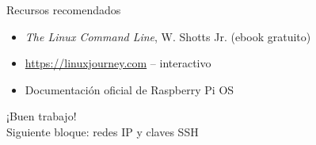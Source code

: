 \documentclass[aspectratio=169,professionalfonts]{beamer}
\begin{document}
\begin{frame}{Recursos recomendados}
\begin{itemize}
  \item \emph{The Linux Command Line}, W. Shotts Jr. (ebook gratuito)
  \item \url{https://linuxjourney.com} -- interactivo
  \item Documentación oficial de Raspberry Pi OS
\end{itemize}
\end{frame}

\begin{frame}[plain]
  \centering \Huge ¡Buen trabajo!\\[1ex]
  Siguiente bloque: redes IP y claves SSH
\end{frame}
\end{document}
